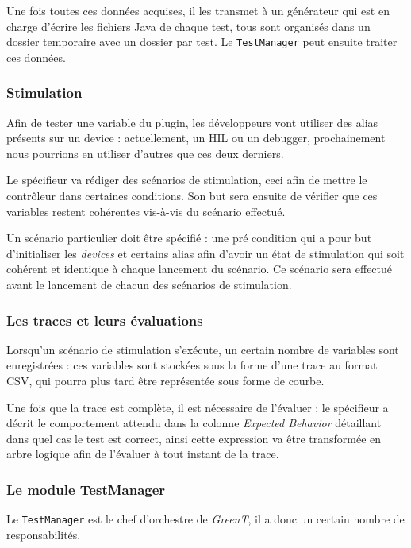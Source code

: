 	Une fois toutes ces données acquises, il les transmet à un générateur qui est en charge d'écrire les fichiers Java de chaque test, tous sont organisés dans un dossier temporaire avec un dossier par test. Le \texttt{TestManager} peut ensuite traiter ces données.

	\subsubsection{Stimulation} \label{stim}
		Afin de tester une variable du plugin, les développeurs vont utiliser des alias présents sur un device : actuellement, un HIL ou un debugger, prochainement nous pourrions en utiliser d'autres que ces deux derniers.

		Le spécifieur va rédiger des scénarios de stimulation, ceci afin de mettre le contrôleur dans certaines conditions. Son but sera ensuite de vérifier que ces variables restent cohérentes vis-à-vis du scénario effectué. 

		Un scénario particulier doit être spécifié : une pré condition qui a pour but d'initialiser les \textit{devices} et certains alias afin d'avoir un état de stimulation qui soit cohérent et identique à chaque lancement du scénario. Ce scénario sera effectué avant le lancement de chacun des scénarios de stimulation.

	\subsubsection{Les traces et leurs évaluations}\label{expectedBehavior}
	Lorsqu'un scénario de stimulation s'exécute, un certain nombre de variables sont enregistrées : ces variables sont stockées sous la forme d'une trace au format CSV, qui pourra plus tard être représentée sous forme de courbe. 

	Une fois que la trace est complète, il est nécessaire de l'évaluer : le spécifieur a décrit le comportement attendu dans la colonne \textit{Expected Behavior} détaillant dans quel cas le test est correct, ainsi cette expression va être transformée en arbre logique afin de l'évaluer à tout instant de la trace. 

	\subsubsection{Le module TestManager}\label{testManager}
	Le \texttt{TestManager} est le chef d'orchestre de \textit{GreenT}, il a donc un certain nombre de responsabilités. 

